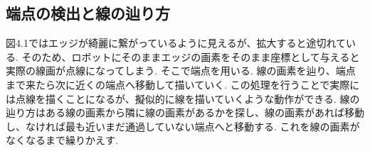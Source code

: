 	\subsection{端点の検出と線の辿り方}
	\label{chap:end points detection}
	図4.1ではエッジが綺麗に繋がっているように見えるが、拡大すると途切れている. そのため、ロボットにそのままエッジの画素をそのまま座標として与えると実際の線画が点線になってしまう. そこで端点を用いる. 線の画素を辿り、端点まで来たら次に近くの端点へ移動して描いていく. この処理を行うことで実際には点線を描くことになるが、擬似的に線を描いていくような動作ができる.
	線の辿り方はある線の画素から隣に線の画素があるかを探し、線の画素があれば移動し、なければ最も近いまだ通過していない端点へと移動する. これを線の画素がなくなるまで繰りかえす.

